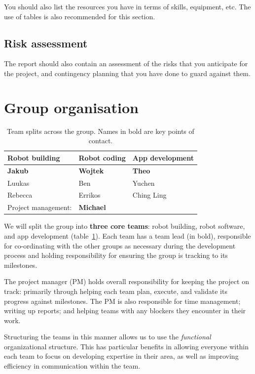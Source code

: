 \documentclass{article}
\begin{document}
You should also list the resources you have in terms of skills, equipment, etc. The use of tables is also recommended for this section.

\subsection{Risk assessment} 
The report should also contain an assessment of the risks that you anticipate for the project, and contingency planning that you have done to guard against them. 

\section{Group organisation}
\begin{table}[]
  \begin{tabular}{lll}
    \hline
    Robot building & Robot coding & App development   \\
    \hline
    {\bf Jakub}          & {\bf Wojtek}       & {\bf Theo}              \\
    Luukas         & Ben          & Yuchen            \\
    Rebecca        & Errikos      & Ching Ling \\
    \hline
    Project management: & {\bf Michael} & \\
  \end{tabular}
  \caption{Team splits across the group. Names in bold are key points of contact.}
  \label{tab:group-split}
\end{table}

We will split the group into {\bf three core teams}: robot building, robot software, and app development (table~\ref{tab:group-split}). Each team has a team lead (in bold), responsible for co-ordinating with the other groups as necessary during the development process and holding responsibility for ensuring the group is tracking to its milestones.

The project manager (PM) holds overall responsibility for keeping the project on track: primarily through helping each team plan, execute, and validate its progress against milestones. The PM is also responsible for time management; writing up reports; and helping teams with any blockers they encounter in their work.

Structuring the teams in this manner allows us to use the {\it functional} organizational structure. This has particular benefits in allowing everyone within each team to focus on developing expertise in their area, as well as improving efficiency in communication within the team.
\end{document}
